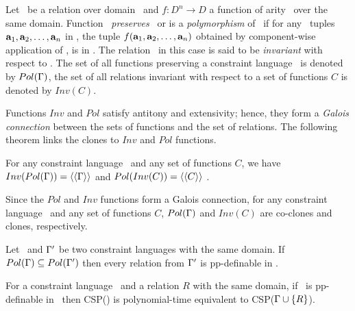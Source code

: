 Let \mR\ be a relation over domain \mD\ and \(f:D^n\to D\) a function of arity \mn\ over the
same domain. Function \mf\ \emph{preserves} \mR\ or is a \emph{polymorphism} of \mR\ if
for any \mn\ tuples \(\textbf{a}_1,\textbf{a}_2,\dotsc,\textbf{a}_n\) in \mR, the tuple
\(f(\textbf{a}_1,\textbf{a}_2,\dotsc,\textbf{a}_n)\) obtained by component-wise application of \mf,
is in \mR\@. The relation \mR\ in this case is said to be \emph{invariant} with respect 
to \mf\@.
The set of all functions preserving a constraint language \mrelset\ is 
denoted by \(Pol(\Gamma)\), the set of all relations invariant with respect to a set of
functions  \(C\) is denoted by \(Inv(C)\)\@.

Functions \(Inv\) and \(Pol\) satisfy antitony and extensivity; hence, they 
form a \emph{Galois connection} between the sets of functions 
and the set of relations. The following theorem links the clones to \(Inv\) and \(Pol\)
functions.

\begin{theorem}
For any constraint language \mrelset\ and 
any set of functions \(C\), 
we have \(Inv(Pol(\Gamma))=\langle\langle \Gamma \rangle\rangle\)
and
\(Pol(Inv(C))=\langle\langle C \rangle\rangle\)
\@.
\end{theorem}

\begin{cor}
Since the \(Pol\) and \(Inv\) functions form a Galois connection, for any
constraint language \mrelset\ and any set of functions \(C\), 
\(Pol(\Gamma)\) and \(Inv(C)\) are co-clones and clones, respectively.
\end{cor}

\begin{cor}
Let \mrelset\ and \(\Gamma'\) be two constraint languages with the same domain.
If \(Pol(\Gamma) \subseteq Pol(\Gamma')\) then every relation from \(\Gamma'\)  is 
pp-definable in \mrelset\@.
\end{cor}

\begin{theorem}  \label{trm:jeavons}
For a constraint language \mrelset\ and a relation \(R\) with the same domain,
if \mR\ is pp-definable in \mrelset\ then CSP(\mrelset) is polynomial-time equivalent 
to CSP(\(\Gamma \cup \{{R}\}\))\@.
\end{theorem}

